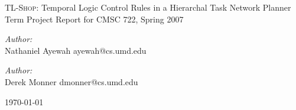 \begin{titlepage}

\begin{center}


\vfill
{\LARGE \textsc{TL-Shop}: Temporal Logic Control Rules in a Hierarchal Task Network Planner}\\[5cm]

{\Large Term Project Report for CMSC 722, Spring 2007}\\[3cm]


\begin{minipage}{0.4\textwidth}
\begin{flushleft} \large
\emph{Author:}\\
Nathaniel Ayewah
ayewah@cs.umd.edu
\end{flushleft}
\end{minipage}
\begin{minipage}{0.4\textwidth}
\begin{flushright} \large
\emph{Author:} \\
Derek Monner
dmonner@cs.umd.edu
\end{flushright}
\end{minipage}

\vfill

{\large \today}

\end{center}

\end{titlepage}
